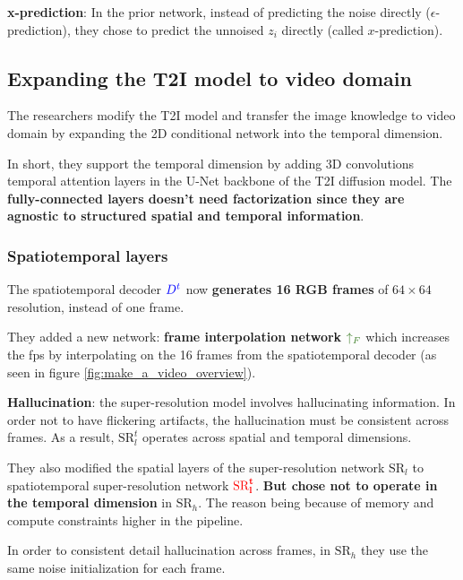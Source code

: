 \textbf{x-prediction}: In the prior network, instead of predicting the noise directly ($\epsilon$-prediction), they chose to predict the unnoised $z_i$ directly (called $x$-prediction).





\subsection{Expanding the T2I model to video domain}
\label{sec:make_a_video_expanding_t2i_to_video}

The researchers modify the T2I model and transfer the image knowledge to video domain by expanding the 2D conditional network into the temporal dimension.

In short, they support the temporal dimension by adding 3D convolutions temporal attention layers in the U-Net backbone of the T2I diffusion model. The \textbf{fully-connected layers doesn't need factorization since they are agnostic to structured spatial and temporal information}.



\subsubsection{Spatiotemporal layers}

The spatiotemporal decoder $\textcolor{blue}{D^t}$ now \textbf{generates 16 RGB frames} of $64\times 64$ resolution, instead of one frame.

They added a new network: \textbf{frame interpolation network} $\textcolor{OliveGreen}{\uparrow_F}$ which increases the fps by interpolating on the 16 frames from the spatiotemporal decoder (as seen in figure \ref{fig:make_a_video_overview}).

\textbf{Hallucination}: the super-resolution model involves hallucinating information. In order not to have flickering artifacts, the hallucination must be consistent across frames. As a result, $\text{SR}_l^t$ operates across spatial and temporal dimensions.

They also modified the spatial layers of the super-resolution network $\text{SR}_l$ to spatiotemporal super-resolution network $\textcolor{red}{\mathbf{\text{SR}_l^t}}$. \textbf{But chose not to operate in the temporal dimension} in $\text{SR}_h$. The reason being because of memory and compute constraints higher in the pipeline.

In order to consistent detail hallucination across frames, in $\text{SR}_h$ they use the same noise initialization for each frame.



